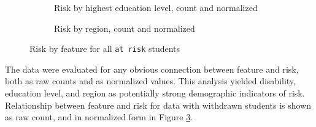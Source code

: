 \documentclass{article}
\begin{document}
\begin{figure}[ht!]
	\begin{subfigure}{.45\textwidth}
		\centering
		\caption{Risk by highest education level, count and normalized}
		\label{fig:risk_by_ed_all}
	\end{subfigure}
	\begin{subfigure}{.45\textwidth}
		\centering
		\caption{Risk by region, count and normalized}
		\label{fig:risk_by_region_all}
	\end{subfigure}
	\caption{Risk by feature for all \texttt{at risk} students}
	\label{fig:feature_risk_all}
\end{figure}

The data were evaluated for any obvious connection between feature and risk, both as raw counts and as normalized values. This analysis yielded disability, education level, and region as potentially strong demographic indicators of risk. Relationship between feature and risk for data with withdrawn students is shown as raw count, and in normalized form in Figure \ref{fig:feature_risk_all}.
\end{document}
